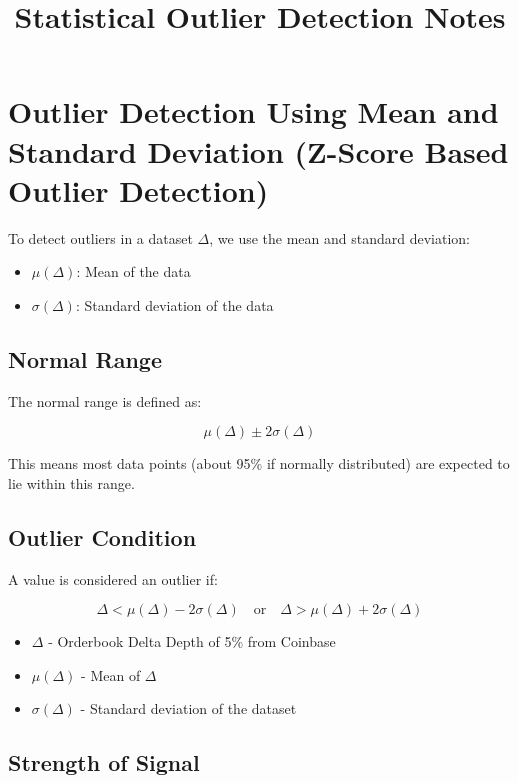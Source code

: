 \documentclass[12pt]{article}
\title{Statistical Outlier Detection Notes}
\author{}
\date{}
\begin{document}
\maketitle

\section*{Outlier Detection Using Mean and Standard Deviation (Z-Score Based Outlier Detection)}

To detect outliers in a dataset $\Delta$, we use the mean and standard deviation:

\begin{itemize}
    \item $\mu(\Delta)$: Mean of the data
    \item $\sigma(\Delta)$: Standard deviation of the data
\end{itemize}

\subsection*{Normal Range}

The normal range is defined as:

\[
\mu(\Delta) \pm 2\sigma(\Delta)
\]

This means most data points (about 95\% if normally distributed) are expected to lie within this range.

\subsection*{Outlier Condition}

A value is considered an outlier if:

\[
\Delta < \mu(\Delta) - 2\sigma(\Delta) \quad \text{or} \quad \Delta > \mu(\Delta) + 2\sigma(\Delta)
\]



\begin{itemize}
    \item $\Delta$ - Orderbook Delta Depth of 5\% from Coinbase
    \item $\mu(\Delta)$ - Mean of $\Delta$
    \item $\sigma(\Delta)$ - Standard deviation of the dataset
\end{itemize}


\subsection*{Strength of Signal}
\end{document}
